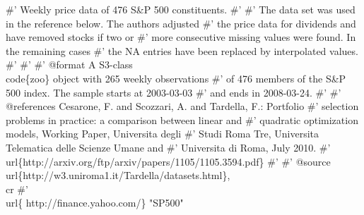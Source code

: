 \documentclass[a4paper]{article}
\begin{document}
\nwenddocs{}\endmoddef\let\nwnotused=\nwoutput{}
#' Weekly price data of 476 S&P 500 constituents.
#'
#' The data set was used in the reference below. The authors adjusted
#' the price data for dividends and have removed stocks if two or
#' more consecutive missing values were found. In the remaining cases
#' the NA entries have been replaced by interpolated values.
#'
#'
#' @format A S3-class \\code\{zoo\} object with 265 weekly observations
#' of 476 members of the S&P 500 index. The sample starts at 2003-03-03
#' and ends in 2008-03-24.
#'
#' @references Cesarone, F. and Scozzari, A. and Tardella, F.: Portfolio
#'     selection problems in practice: a comparison between linear and
#'     quadratic optimization models, Working Paper, Universita degli
#'     Studi Roma Tre, Universita Telematica delle Scienze Umane and
#'     Universita di Roma, July 2010.
#'     \\url\{http://arxiv.org/ftp/arxiv/papers/1105/1105.3594.pdf\}
#'
#' @source \\url\{http://w3.uniroma1.it/Tardella/datasets.html\},\\cr
#' \\url\{ http://finance.yahoo.com/\}
"SP500"
\nwnotused{data.R}\nwendcode{}
%
%
%
%
%
%
%
%
%
%
%
%
%
\end{document}
